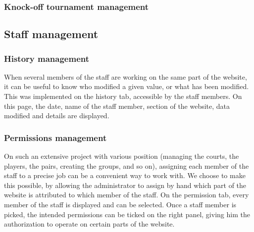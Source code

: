 \subsubsection{Knock-off tournament management}
\label{subs:Knock-off tournament management}


\subsection{Staff management}
\label{sub:Staff management}

\subsubsection{History management}
\label{subs:History management}


When several members of the staff are working on the same part of the website, it can be useful to know who modified a given value, or what has been modified. This was implemented on the history tab, accessible by the staff members. On this page, the date, name of the staff member, section of the website, data modified and details are displayed.

\subsubsection{Permissions management}
\label{subs:Permissions management}


On such an extensive project with various position (managing the courts, the players, the pairs, creating the groups, and so on), assigning each member of the staff to a precise job can be a convenient way to work with. We choose to make this possible, by allowing the administrator to assign by hand which part of the website is attributed to which member of the staff. On the permission tab, every member of the staff is displayed and can be selected. Once a staff member is picked, the intended permissions can be ticked on the right panel, giving him the authorization to operate on certain parts of the website.
